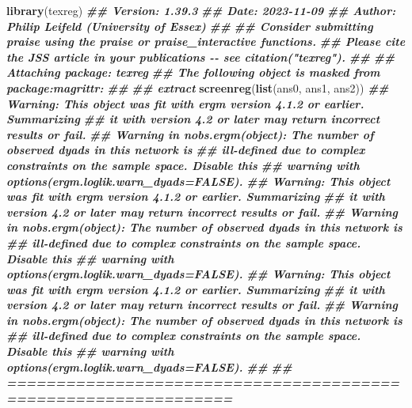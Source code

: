 \documentclass[
]{book}
\newenvironment{Shaded}{\begin{snugshade}}{\end{snugshade}}
\newcommand{\DocumentationTok}[1]{\textcolor[rgb]{0.56,0.35,0.01}{\textbf{\textit{#1}}}}
\newcommand{\FunctionTok}[1]{\textcolor[rgb]{0.13,0.29,0.53}{\textbf{#1}}}
\newcommand{\NormalTok}[1]{#1}
\begin{document}
\begin{Shaded}
\begin{Highlighting}[]
\FunctionTok{library}\NormalTok{(texreg)}
\DocumentationTok{\#\# Version:  1.39.3}
\DocumentationTok{\#\# Date:     2023{-}11{-}09}
\DocumentationTok{\#\# Author:   Philip Leifeld (University of Essex)}
\DocumentationTok{\#\# }
\DocumentationTok{\#\# Consider submitting praise using the praise or praise\_interactive functions.}
\DocumentationTok{\#\# Please cite the JSS article in your publications {-}{-} see citation("texreg").}
\DocumentationTok{\#\# }
\DocumentationTok{\#\# Attaching package: \textquotesingle{}texreg\textquotesingle{}}
\DocumentationTok{\#\# The following object is masked from \textquotesingle{}package:magrittr\textquotesingle{}:}
\DocumentationTok{\#\# }
\DocumentationTok{\#\#     extract}
\FunctionTok{screenreg}\NormalTok{(}\FunctionTok{list}\NormalTok{(ans0, ans1, ans2))}
\DocumentationTok{\#\# Warning: This object was fit with \textquotesingle{}ergm\textquotesingle{} version 4.1.2 or earlier. Summarizing}
\DocumentationTok{\#\# it with version 4.2 or later may return incorrect results or fail.}
\DocumentationTok{\#\# Warning in nobs.ergm(object): The number of observed dyads in this network is}
\DocumentationTok{\#\# ill{-}defined due to complex constraints on the sample space. Disable this}
\DocumentationTok{\#\# warning with \textquotesingle{}options(ergm.loglik.warn\_dyads=FALSE)\textquotesingle{}.}
\DocumentationTok{\#\# Warning: This object was fit with \textquotesingle{}ergm\textquotesingle{} version 4.1.2 or earlier. Summarizing}
\DocumentationTok{\#\# it with version 4.2 or later may return incorrect results or fail.}
\DocumentationTok{\#\# Warning in nobs.ergm(object): The number of observed dyads in this network is}
\DocumentationTok{\#\# ill{-}defined due to complex constraints on the sample space. Disable this}
\DocumentationTok{\#\# warning with \textquotesingle{}options(ergm.loglik.warn\_dyads=FALSE)\textquotesingle{}.}
\DocumentationTok{\#\# Warning: This object was fit with \textquotesingle{}ergm\textquotesingle{} version 4.1.2 or earlier. Summarizing}
\DocumentationTok{\#\# it with version 4.2 or later may return incorrect results or fail.}
\DocumentationTok{\#\# Warning in nobs.ergm(object): The number of observed dyads in this network is}
\DocumentationTok{\#\# ill{-}defined due to complex constraints on the sample space. Disable this}
\DocumentationTok{\#\# warning with \textquotesingle{}options(ergm.loglik.warn\_dyads=FALSE)\textquotesingle{}.}
\DocumentationTok{\#\# }
\DocumentationTok{\#\# ===============================================================}

\end{Highlighting}
\end{Shaded}
\end{document}
